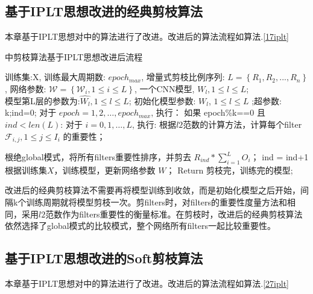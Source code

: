 \documentclass[ pdftex, oneside, master]{NJUthesis}
\begin{document}
\subsection{基于IPLT思想改进的经典剪枝算法}

本章基于IPLT思想对\cite{17}中的算法进行了改进。改进后的算法流程如算法.\ref{17iplt}

\begin{algorithm}[htb]
  \caption{\cite{17}中剪枝算法基于IPLT思想改进后流程}
  \label{17iplt}
  \begin{algorithmic}[1]
    \REQUIRE
      训练集:X, 训练最大周期数: $epoch_{max}$,
      增量式剪枝比例序列: $L = \left\{R_1, R_2, ..., R_n\right\}$ ,
      网络参数: $\mathcal{W} = \left\{\mathcal{W}_i , 1\leq i \leq L \right\}$,
      一个CNN模型, ${W_l,1\leq l\leq L}$;\\
    \ENSURE 模型第L层的参数为:${\hat{W_l}, 1\leq l\leq L}$;
    \STATE 初始化模型参数: ${W_l}$, ${1\leq l\leq L}$ ;超参数: k;ind=0;
    \STATE 对于 ${epoch=1, 2, \ldots, epoch_{max}}$, 执行：
    \STATE \qquad 如果 epoch\%k==0 且 $ind<len(L)$:
    \STATE \qquad \qquad 对于 $i=0, 1, \ldots, L$, 执行:
    \STATE \qquad \qquad \qquad 根据$l2$范数的计算方法，计算每个filter $\mathcal{F}_{i,j}, 1\leq j \leq I_i$ 的重要性；

    \STATE \qquad \qquad  根绝global模式，将所有filters重要性排序，并剪去 $R_{ind}\ast\sum_{i=1}^LO_i$；
    \STATE \qquad \qquad ind = ind+1
    \STATE \qquad 根据训练集$X$，训练模型，更新网络参数 $W$；
    \STATE Return 剪枝完，训练完的模型;
  \end{algorithmic}
\end{algorithm}

改进后的经典剪枝算法不需要再将模型训练到收敛，而是初始化模型之后开始，间隔k个训练周期就将模型剪枝一次。剪filters时，对filters的重要性度量方法和\cite{17}相同，采用$l2$范数作为filters重要性的衡量标准。在剪枝时，改进后的经典剪枝算法依然选择了global模式的比较模式，整个网络所有filters一起比较重要性。


\subsection{基于IPLT思想改进的Soft剪枝算法}

本章基于IPLT思想对\cite{27}中的算法进行了改进。改进后的算法流程如算法.\ref{27iplt}
\end{document}
